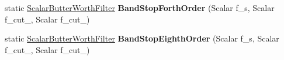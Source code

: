\begin{DoxyCompactItemize}
\item 
static \hyperlink{classow__core_1_1ScalarButterWorthFilter}{Scalar\+Butter\+Worth\+Filter} {\bfseries Band\+Stop\+Forth\+Order} (Scalar f\+\_\+s, Scalar f\+\_\+cut\+\_, Scalar f\+\_\+cut\+\_)\hypertarget{classow__core_1_1ScalarButterWorthFilter_a5ed1f24735bd35e34ff09bbde0a5cb8b}{}\label{classow__core_1_1ScalarButterWorthFilter_a5ed1f24735bd35e34ff09bbde0a5cb8b}

\item 
static \hyperlink{classow__core_1_1ScalarButterWorthFilter}{Scalar\+Butter\+Worth\+Filter} {\bfseries Band\+Stop\+Eighth\+Order} (Scalar f\+\_\+s, Scalar f\+\_\+cut\+\_, Scalar f\+\_\+cut\+\_)\hypertarget{classow__core_1_1ScalarButterWorthFilter_ab7cec28394c67ef36f136fd7a92e67ee}{}\label{classow__core_1_1ScalarButterWorthFilter_ab7cec28394c67ef36f136fd7a92e67ee}

\end{DoxyCompactItemize}
